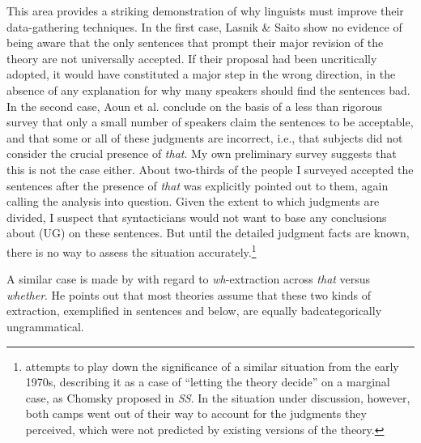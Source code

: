 This area provides a striking demonstration of why linguists must improve their data-gathering techniques. In the first case, Lasnik \& Saito show no evidence of being aware that the only sentences that prompt their major revision of the theory are not universally accepted. If their proposal had been uncritically adopted, it would have constituted a major step in the wrong direction, in the absence of any explanation for why many speakers should find the sentences bad. In the second case, Aoun et al. conclude on the basis of a less than rigorous survey that only a small number of speakers claim the sentences to be acceptable, and that some or all of these judgments are incorrect, i.e., that subjects did not consider the crucial presence of \textit{that}. My own preliminary survey suggests that this is not the case either. About two-thirds of the people I surveyed accepted the sentences after the presence of \textit{that} was explicitly pointed out to them, again calling the analysis into question. Given the extent to which judgments are divided, I suspect that syntacticians would not want to base any conclusions about  (UG) on these sentences. But until the detailed judgment facts are known, there is no way to assess the situation accurately.\footnote{\citet{Newmeyer1983} attempts to play down the significance of a similar situation from the early 1970s, describing it as a case of ``letting the theory decide'' on a marginal case, as Chomsky proposed in \textit{SS}. In the situation under discussion, however, both camps went out of their way to account for the judgments they perceived, which were not predicted by existing versions of the theory.}


A similar case is made by \citet{Sobin1987} with regard to \textit{wh}-extraction across \textit{that} versus \textit{whether}. He points out that most theories assume that these two kinds of extraction, exemplified in sentences  and  below, are equally bad\schdash{}categorically  ungrammatical.

\label{ex:2:6}\z

\label{ex:2:7}\z

